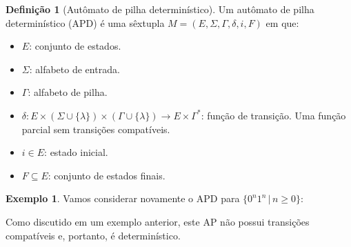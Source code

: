\documentclass[a4paper]{article}
\theoremstyle{definition}
\newtheorem{Example}{Exemplo}
\newtheorem{Definition}{Definição}
\begin{document}
  \begin{Definition}[Autômato de pilha determinístico]
    Um autômato de pilha determinístico (APD) é uma sêxtupla
    $M=(E,\Sigma,\Gamma,\delta,i,F)$ em que:
    \begin{itemize}
       \item $E$: conjunto de estados.
       \item $\Sigma$: alfabeto de entrada.
       \item $\Gamma$: alfabeto de pilha.
       \item $\delta : E \times (\Sigma \cup \{\lambda\}) \times (\Gamma \cup
    \{\lambda\}) \to E \times \Gamma^*$: função de transição. Uma função parcial
    sem transições compatíveis.
       \item $i \in E$: estado inicial.
       \item $F\subseteq E$: conjunto de estados finais.
    \end{itemize}
  \end{Definition}

  \begin{Example}
    Vamos considerar novamente o APD para $\{0^n1^n\,|\,n \geq 0\}$:
    \begin{figure}[H]
      \centering
    \end{figure}
    Como discutido em um exemplo anterior, este AP não possui transições
    compatíveis e, portanto, é determinístico.
  \end{Example}
  
\end{document}
